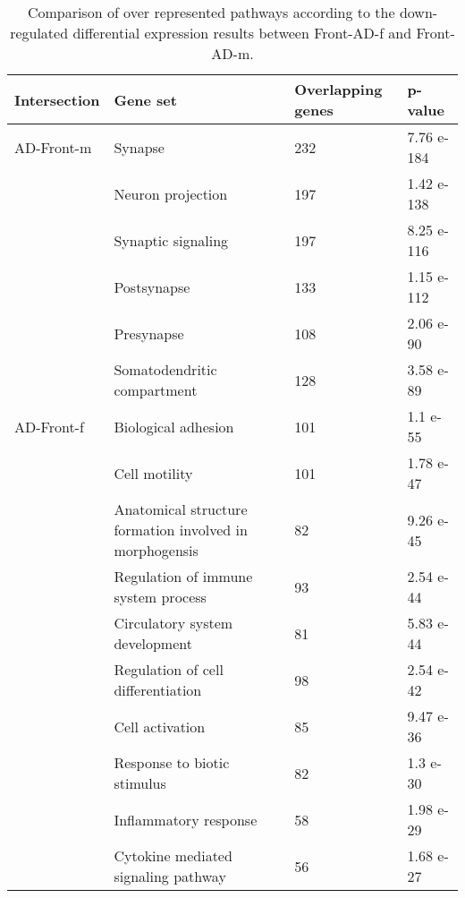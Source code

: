 \begin{table}[!ht]
\centering
\caption{Comparison of over represented pathways according to the down-regulated differential expression results between Front-AD-f and Front-AD-m.}
\begin{tabularx}{11cm}{L{2cm}L{2.5cm}L{3cm}C{1.5cm}}
\toprule
\textbf{Intersection} & \textbf{Gene set} & \textbf{Overlapping genes} & \textbf{p-value} \\
\midrule
AD-Front-m           & Synapse                                                   & 232 & 7.76 e-184 \\
                     & Neuron projection                                         & 197 & 1.42 e-138 \\
                     & Synaptic signaling                                        & 197 & 8.25 e-116 \\
                     & Postsynapse                                               & 133 & 1.15 e-112 \\
                     & Presynapse                                                & 108 & 2.06 e-90  \\
                     & Somatodendritic compartment                               & 128 & 3.58 e-89  \\
AD-Front-f           & Biological   adhesion                                     & 101 & 1.1 e-55   \\
                     & Cell motility                                           & 101 & 1.78 e-47  \\
                     & Anatomical structure formation involved in morphogensis & 82  & 9.26 e-45  \\
                     & Regulation of immune system process                     & 93  & 2.54 e-44  \\
                     & Circulatory system development                          & 81  & 5.83 e-44  \\
                     & Regulation of cell differentiation                      & 98  & 2.54 e-42  \\
 & Cell activation                                         & 85  & 9.47 e-36  \\
 & Response to biotic stimulus                             & 82  & 1.3 e-30   \\
 & Inflammatory response                                   & 58  & 1.98 e-29  \\
 & Cytokine mediated signaling pathway                     & 56  & 1.68 e-27  \\
\bottomrule
\end{tabularx}
\end{table}


